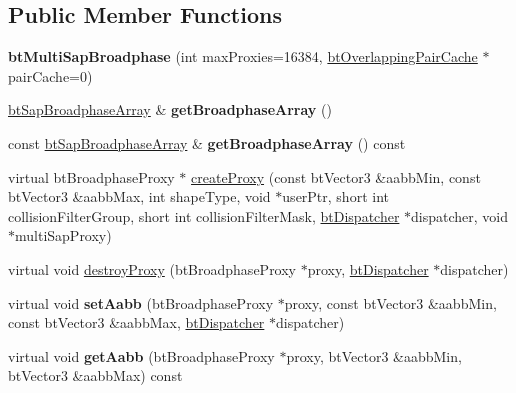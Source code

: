 \subsection*{Public Member Functions}
\begin{DoxyCompactItemize}
\item 
\mbox{\label{classbtMultiSapBroadphase_ac950811ea4dc8e9798165f08cd2a1519}} 
{\bfseries bt\+Multi\+Sap\+Broadphase} (int max\+Proxies=16384, \hyperlink{classbtOverlappingPairCache}{bt\+Overlapping\+Pair\+Cache} $\ast$pair\+Cache=0)
\item 
\mbox{\label{classbtMultiSapBroadphase_a6b867c146b6ad6c9e986a1ff09ec52b2}} 
\hyperlink{classbtAlignedObjectArray}{bt\+Sap\+Broadphase\+Array} \& {\bfseries get\+Broadphase\+Array} ()
\item 
\mbox{\label{classbtMultiSapBroadphase_aa685c49def5d65691720dcd2ae974683}} 
const \hyperlink{classbtAlignedObjectArray}{bt\+Sap\+Broadphase\+Array} \& {\bfseries get\+Broadphase\+Array} () const
\item 
virtual bt\+Broadphase\+Proxy $\ast$ \hyperlink{classbtMultiSapBroadphase_a56e2b68f3b1c54dbc102d5f3b8004d55}{create\+Proxy} (const bt\+Vector3 \&aabb\+Min, const bt\+Vector3 \&aabb\+Max, int shape\+Type, void $\ast$user\+Ptr, short int collision\+Filter\+Group, short int collision\+Filter\+Mask, \hyperlink{classbtDispatcher}{bt\+Dispatcher} $\ast$dispatcher, void $\ast$multi\+Sap\+Proxy)
\item 
virtual void \hyperlink{classbtMultiSapBroadphase_a8cbeafd597e31f634863efe5186000b9}{destroy\+Proxy} (bt\+Broadphase\+Proxy $\ast$proxy, \hyperlink{classbtDispatcher}{bt\+Dispatcher} $\ast$dispatcher)
\item 
\mbox{\label{classbtMultiSapBroadphase_aaef14203e346faabcde9f3ac870f5d66}} 
virtual void {\bfseries set\+Aabb} (bt\+Broadphase\+Proxy $\ast$proxy, const bt\+Vector3 \&aabb\+Min, const bt\+Vector3 \&aabb\+Max, \hyperlink{classbtDispatcher}{bt\+Dispatcher} $\ast$dispatcher)
\item 
\mbox{\label{classbtMultiSapBroadphase_a67e4572cc61b24bd5017eb36bb745958}} 
virtual void {\bfseries get\+Aabb} (bt\+Broadphase\+Proxy $\ast$proxy, bt\+Vector3 \&aabb\+Min, bt\+Vector3 \&aabb\+Max) const

\end{DoxyCompactItemize}
